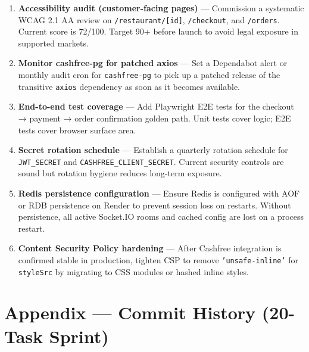 \documentclass[11pt,a4paper]{article}
\begin{document}
\begin{enumerate}[leftmargin=*, label=\textbf{R\arabic*.}, itemsep=6pt]

  \item \textbf{Accessibility audit (customer-facing pages)} ---
    Commission a systematic WCAG 2.1 AA review on \texttt{/restaurant/[id]},
    \texttt{/checkout}, and \texttt{/orders}. Current score is 72/100. Target 90+
    before launch to avoid legal exposure in supported markets.

  \item \textbf{Monitor cashfree-pg for patched axios} ---
    Set a Dependabot alert or monthly audit cron for \texttt{cashfree-pg} to
    pick up a patched release of the transitive \texttt{axios} dependency as soon
    as it becomes available.

  \item \textbf{End-to-end test coverage} ---
    Add Playwright E2E tests for the checkout → payment → order confirmation
    golden path. Unit tests cover logic; E2E tests cover browser surface area.

  \item \textbf{Secret rotation schedule} ---
    Establish a quarterly rotation schedule for \texttt{JWT\_SECRET} and
    \texttt{CASHFREE\_CLIENT\_SECRET}. Current security controls are sound but
    rotation hygiene reduces long-term exposure.

  \item \textbf{Redis persistence configuration} ---
    Ensure Redis is configured with AOF or RDB persistence on Render to prevent
    session loss on restarts. Without persistence, all active Socket.IO rooms
    and cached config are lost on a process restart.

  \item \textbf{Content Security Policy hardening} ---
    After Cashfree integration is confirmed stable in production, tighten CSP
    to remove \texttt{'unsafe-inline'} for \texttt{styleSrc} by migrating to CSS
    modules or hashed inline styles.

\end{enumerate}

\section*{Appendix — Commit History (20-Task Sprint)}
\end{document}
